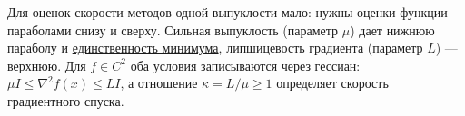 Для оценок скорости методов одной выпуклости мало: нужны оценки функции параболами снизу и сверху. Сильная выпуклость (параметр $\mu$) дает нижнюю параболу и \hyperref[note:51CC880D-BF19-43E2-9599-FB31A9A7367F]{единственность минимума}, липшицевость градиента (параметр $L$) --- верхнюю. Для $f \in C^2$ оба условия записываются через гессиан: $\mu I \le \nabla^2 f(x) \le L I$, а отношение $\kappa = L/\mu \ge 1$ определяет скорость градиентного спуска.
